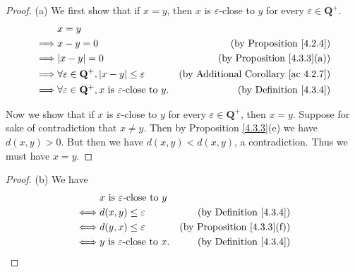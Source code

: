\begin{proof}{(a)}
    We first show that if \(x = y\), then \(x\) is \(\varepsilon\)-close to \(y\) for every \(\varepsilon \in \mathbf{Q}^+\).
    \begin{align*}
                 & x = y                                                                                                                             \\
        \implies & x - y = 0                                                                       & \text{(by Proposition \ref{4.2.4})}             \\
        \implies & \abs*{x - y} = 0                                                                & \text{(by Proposition \ref{4.3.3}(a))}          \\
        \implies & \forall \varepsilon \in \mathbf{Q}^+, \abs*{x - y} \leq \varepsilon             & \text{(by Additional Corollary \ref{ac 4.2.7})} \\
        \implies & \forall \varepsilon \in \mathbf{Q}^+, x \text{ is \(\varepsilon\)-close to } y. & \text{(by Definition \ref{4.3.4})}
    \end{align*}

    Now we show that if \(x\) is \(\varepsilon\)-close to \(y\) for every \(\varepsilon \in \mathbf{Q}^+\), then \(x = y\).
    Suppose for sake of contradiction that \(x \neq y\).
    Then by Proposition \ref{4.3.3}(e) we have \(d(x, y) > 0\).
    But then we have \(d(x, y) < d(x, y)\), a contradiction.
    Thus we must have \(x = y\).
\end{proof}

\begin{proof}{(b)}
    We have
    \begin{align*}
             & x \text{ is \(\varepsilon\)-close to } y                                           \\
        \iff & d(x, y) \leq \varepsilon                  & \text{(by Definition \ref{4.3.4})}     \\
        \iff & d(y, x) \leq \varepsilon                  & \text{(by Proposition \ref{4.3.3}(f))} \\
        \iff & y \text{ is \(\varepsilon\)-close to } x. & \text{(by Definition \ref{4.3.4})}
    \end{align*}
\end{proof}

